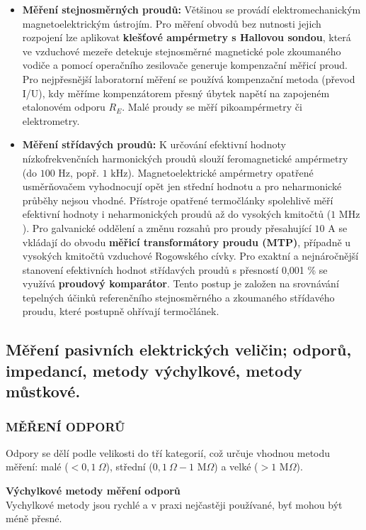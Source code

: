         \begin{itemize}
            \item \textbf{Měření stejnosměrných proudů:} Většinou se provádí elektromechanickým magnetoelektrickým ústrojím. Pro měření obvodů bez nutnosti jejich rozpojení lze aplikovat \textbf{klešťové ampérmetry s Hallovou sondou}, která ve vzduchové mezeře detekuje stejnosměrné magnetické pole zkoumaného vodiče a pomocí operačního zesilovače generuje kompenzační měřicí proud. Pro nejpřesnější laboratorní měření se používá kompenzační metoda (převod I/U), kdy měříme kompenzátorem přesný úbytek napětí na zapojeném etalonovém odporu $R_E$. Malé proudy se měří pikoampérmetry či elektrometry.
            \item \textbf{Měření střídavých proudů:} K určování efektivní hodnoty nízkofrekvenčních harmonických proudů slouží feromagnetické ampérmetry (do $100\text{ Hz}$, popř. $1\text{ kHz}$). Magnetoelektrické ampérmetry opatřené usměrňovačem vyhodnocují opět jen střední hodnotu a pro neharmonické průběhy nejsou vhodné. Přístroje opatřené termočlánky spolehlivě měří efektivní hodnoty i neharmonických proudů až do vysokých kmitočtů ($1\text{ MHz}$). Pro galvanické oddělení a změnu rozsahů pro proudy přesahující $10\text{ A}$ se vkládají do obvodu \textbf{měřicí transformátory proudu (MTP)}, případně u vysokých kmitočtů vzduchové Rogowského cívky. Pro exaktní a nejnáročnější stanovení efektivních hodnot střídavých proudů s přesností 0,001 \% se využívá \textbf{proudový komparátor}. Tento postup je založen na srovnávání tepelných účinků referenčního stejnosměrného a zkoumaného střídavého proudu, které postupně ohřívají termočlánek.
        \end{itemize}\textbf{}
\subsection{Měření pasivních elektrických veličin; odporů, impedancí, metody výchylkové, metody můstkové. }
    \subsubsection{MĚŘENÍ ODPORŮ}

        Odpory se dělí podle velikosti do tří kategorií, což určuje vhodnou metodu měření: malé ($< 0,1\ \Omega$), střední ($0,1\ \Omega - 1\text{ M}\Omega$) a velké ($> 1\text{ M}\Omega$).
        
        \textbf{Výchylkové metody měření odporů}\\
        Vychylkové metody jsou rychlé a v praxi nejčastěji používané, byť mohou být méně přesné.
        
